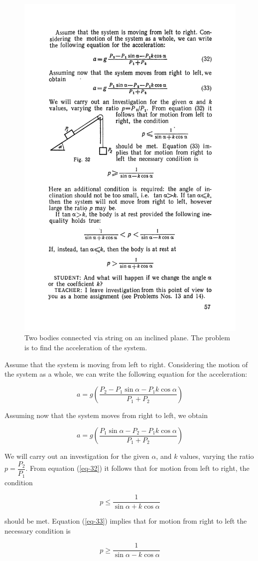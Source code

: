 \documentclass[a4paper,sfsidenotes]{tufte-book}
\begin{document}
\begin{figure}
\centering
\includegraphics[width=0.4\linewidth]{fig-032a.pdf}
\caption{Two bodies connected via string on an inclined plane. The problem is to find the acceleration of the system.}
\label{fig-32}
\end{figure}

Assume that the system is moving from left to right. Considering the motion of the system as a whole, we can write the following equation for the acceleration:

\begin{equation}
a = g \left( \frac{P_{2} - P_{1} \sin \alpha - P_{1} k \cos \alpha}{P_{1}+P_{2}}\right)
\label{eq-32}
\end{equation}

Assuming now that the system moves from right to left, we obtain

\begin{equation}
a = g \left( \frac{P_{1} \sin \alpha - P_{2} - P_{1} k \cos \alpha}{P_{1}+P_{2}}\right)
\label{eq-33}
\end{equation}

We will carry out an investigation for the given $\alpha$, and $k$ values, varying the ratio $p=\dfrac{P_{2} }{P_{1}}$. From equation (\ref{eq-32}) it follows that for motion from left to right, the condition 

\begin{equation*}
p \leqslant \frac{1}{\sin \alpha + k \cos \alpha}
\end{equation*}

should be met. Equation (\ref{eq-33}) implies that for motion from right to left the necessary condition is

\begin{equation*}
p \geqslant \frac{1}{\sin \alpha - k \cos \alpha}
\end{equation*}
\end{document}
